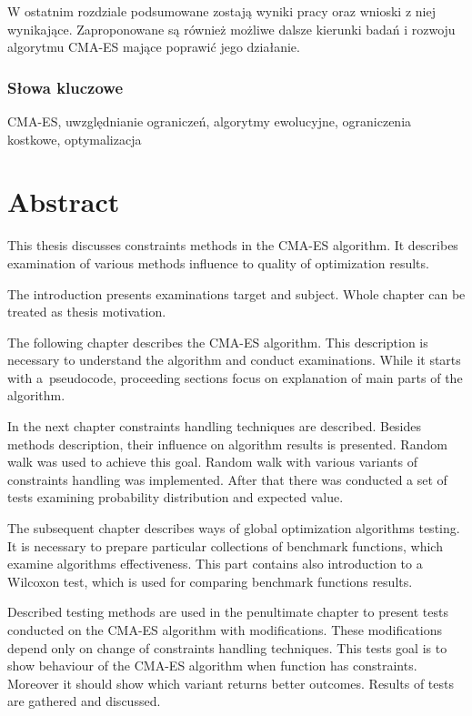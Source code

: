 \documentclass{mini}
\begin{document}
W ostatnim rozdziale podsumowane zostają wyniki pracy oraz wnioski z niej wynikające. Zaproponowane są również możliwe dalsze kierunki badań i rozwoju algorytmu CMA-ES mające poprawić jego działanie.

\subsubsection*{Słowa kluczowe}
CMA-ES, uwzględnianie ograniczeń, algorytmy ewolucyjne, ograniczenia kostkowe, optymalizacja

\pagebreak

\section{Abstract}
\hspace{3,4ex}This thesis discusses constraints methods in the CMA-ES algorithm. It describes examination of various methods influence to quality of optimization results.

The introduction presents examinations target and subject. Whole chapter can be treated as thesis motivation.

The following chapter describes the CMA-ES algorithm. This description is necessary to understand the algorithm and conduct examinations. While it starts with a~pseudocode, proceeding sections focus on explanation of main parts of the algorithm.

In the next chapter constraints handling techniques are described. Besides methods description, their influence on algorithm results is presented. Random walk was used to achieve this goal. Random walk with various variants of constraints handling was implemented. After that there was conducted a set of tests examining probability distribution and expected value.

The subsequent chapter describes ways of global optimization algorithms testing. It is necessary to prepare particular collections of benchmark functions, which examine algorithms effectiveness. This part contains also introduction to a Wilcoxon test, which is used for comparing benchmark functions results.

Described testing methods are used in the penultimate chapter to present tests conducted on the CMA-ES algorithm with modifications. These modifications depend only on change of constraints handling techniques. This tests goal is to show behaviour of the CMA-ES algorithm when function has constraints. Moreover it should show which variant returns better outcomes. Results of tests are gathered and discussed.
\end{document}
